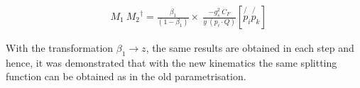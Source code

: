 \begin{equation}
\begin{split}
&M_1\: {M_2}^{\dagger} = \frac{\beta_1}{(1-\beta_1)} \times \: \frac{-g_s^2\: C_F }{y \:(p_i \cdot Q)} [\not{p_i} \not{p_k}]
\end{split}
\end{equation}

With the transformation $ \beta_1 \rightarrow z $, the same results are obtained in each step and hence, it was demonstrated that with the new kinematics the same splitting function can be obtained as in the old parametrisation.

